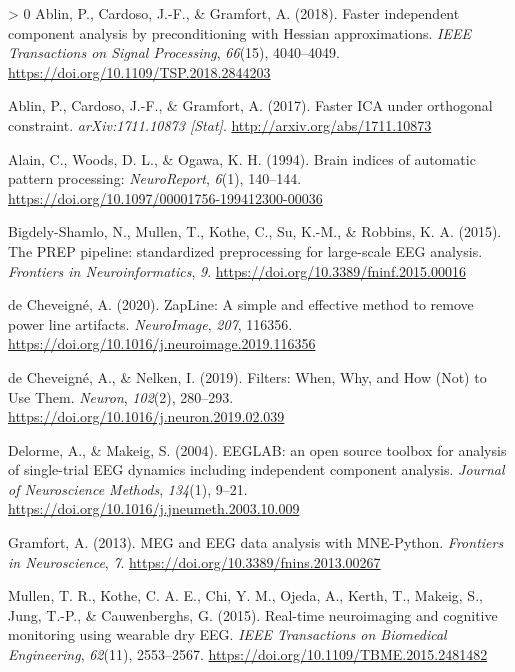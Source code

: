 \documentclass[stu,a4paper,12pt, nofontenc, babel, american]{apa7}
\newlength{\cslhangindent}
\newenvironment{CSLReferences}[3] %
 {%
  \setlength{\parindent}{0pt}
  \ifodd #1 \everypar{\setlength{\hangindent}{\cslhangindent}}\ignorespaces\fi
  \ifnum #2 > 0
  \setlength{\parskip}{#3\baselineskip}
  \fi
 }%
 {}
\begin{document}
\hypertarget{refs}{}
\begin{CSLReferences}{1}{0}
\leavevmode\hypertarget{ref-ablinFasterIndependentComponent2018}{}%
Ablin, P., Cardoso, J.-F., \& Gramfort, A. (2018). Faster independent
component analysis by preconditioning with Hessian approximations.
\emph{IEEE Transactions on Signal Processing}, \emph{66}(15),
4040--4049. \url{https://doi.org/10.1109/TSP.2018.2844203}

\leavevmode\hypertarget{ref-ablinFasterICAOrthogonal2017}{}%
Ablin, P., Cardoso, J.-F., \& Gramfort, A. (2017). Faster ICA under
orthogonal constraint. \emph{arXiv:1711.10873 {[}Stat{]}}.
\url{http://arxiv.org/abs/1711.10873}

\leavevmode\hypertarget{ref-alainBrainIndicesAutomatic1994}{}%
Alain, C., Woods, D. L., \& Ogawa, K. H. (1994). Brain indices of
automatic pattern processing: \emph{NeuroReport}, \emph{6}(1), 140--144.
\url{https://doi.org/10.1097/00001756-199412300-00036}

\leavevmode\hypertarget{ref-bigdely-shamloPREPPipelineStandardized2015}{}%
Bigdely-Shamlo, N., Mullen, T., Kothe, C., Su, K.-M., \& Robbins, K. A.
(2015). The PREP pipeline: standardized preprocessing for large-scale
EEG analysis. \emph{Frontiers in Neuroinformatics}, \emph{9}.
\url{https://doi.org/10.3389/fninf.2015.00016}

\leavevmode\hypertarget{ref-decheveigneZapLineSimpleEffective2020}{}%
de Cheveigné, A. (2020). ZapLine: A simple and effective method to
remove power line artifacts. \emph{NeuroImage}, \emph{207}, 116356.
\url{https://doi.org/10.1016/j.neuroimage.2019.116356}

\leavevmode\hypertarget{ref-decheveigneFiltersWhenWhy2019}{}%
de Cheveigné, A., \& Nelken, I. (2019). Filters: When, Why, and How
(Not) to Use Them. \emph{Neuron}, \emph{102}(2), 280--293.
\url{https://doi.org/10.1016/j.neuron.2019.02.039}

\leavevmode\hypertarget{ref-delormeEEGLABOpenSource2004}{}%
Delorme, A., \& Makeig, S. (2004). EEGLAB: an open source toolbox for
analysis of single-trial EEG dynamics including independent component
analysis. \emph{Journal of Neuroscience Methods}, \emph{134}(1), 9--21.
\url{https://doi.org/10.1016/j.jneumeth.2003.10.009}

\leavevmode\hypertarget{ref-gramfortMEGEEGData2013}{}%
Gramfort, A. (2013). MEG and EEG data analysis with MNE-Python.
\emph{Frontiers in Neuroscience}, \emph{7}.
\url{https://doi.org/10.3389/fnins.2013.00267}

\leavevmode\hypertarget{ref-mullenRealtimeNeuroimagingCognitive2015}{}%
Mullen, T. R., Kothe, C. A. E., Chi, Y. M., Ojeda, A., Kerth, T.,
Makeig, S., Jung, T.-P., \& Cauwenberghs, G. (2015). Real-time
neuroimaging and cognitive monitoring using wearable dry EEG. \emph{IEEE
Transactions on Biomedical Engineering}, \emph{62}(11), 2553--2567.
\url{https://doi.org/10.1109/TBME.2015.2481482}


\end{CSLReferences}
\end{document}
